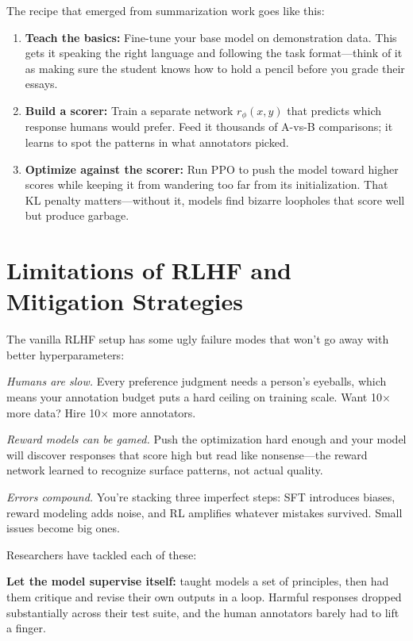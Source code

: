 \documentclass[12pt,a4paper]{report}
\theoremstyle{definition}
\begin{document}
The recipe that emerged from summarization work \cite{stiennon2020learning} goes like this:
\begin{enumerate}
    \item \textbf{Teach the basics:} Fine-tune your base model on demonstration data. This gets it speaking the right language and following the task format---think of it as making sure the student knows how to hold a pencil before you grade their essays.
    \item \textbf{Build a scorer:} Train a separate network $r_\phi(x, y)$ that predicts which response humans would prefer. Feed it thousands of A-vs-B comparisons; it learns to spot the patterns in what annotators picked.
    \item \textbf{Optimize against the scorer:} Run PPO to push the model toward higher scores while keeping it from wandering too far from its initialization. That KL penalty matters---without it, models find bizarre loopholes that score well but produce garbage.
\end{enumerate}

\section{Limitations of RLHF and Mitigation Strategies}

The vanilla RLHF setup has some ugly failure modes that won't go away with better hyperparameters:

\textit{Humans are slow.} Every preference judgment needs a person's eyeballs, which means your annotation budget puts a hard ceiling on training scale. Want 10$\times$ more data? Hire 10$\times$ more annotators.

\textit{Reward models can be gamed.} Push the optimization hard enough and your model will discover responses that score high but read like nonsense---the reward network learned to recognize surface patterns, not actual quality.

\textit{Errors compound.} You're stacking three imperfect steps: SFT introduces biases, reward modeling adds noise, and RL amplifies whatever mistakes survived. Small issues become big ones.

Researchers have tackled each of these:

\textbf{Let the model supervise itself:} \citet{bai2022constitutional} taught models a set of principles, then had them critique and revise their own outputs in a loop. Harmful responses dropped substantially across their test suite, and the human annotators barely had to lift a finger.
\end{document}
